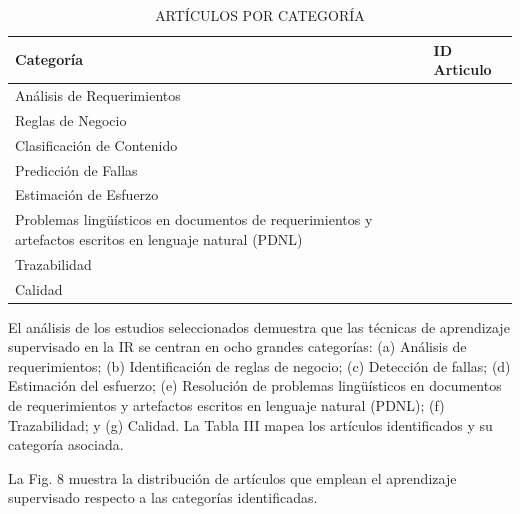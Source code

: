 \documentclass[journal]{IEEEtran}
\begin{document}
\begin{table}[!t]
\renewcommand{\arraystretch}{1.3}
\caption{ARTÍCULOS POR CATEGORÍA}
\label{tabla3}
\centering
\begin{tabular}{p{3cm}p{4.5cm}}
\hline
\hline
Categoría & ID Articulo \\
\hline
Análisis de Requerimientos & \cite{Wang2016} \\ \cline{1-2}
Reglas de Negocio & \cite{sharma2014automated} \\ \cline{1-2}
Clasificación de Contenido & \cite{li2017identifying,Jindal20162027,kurtanovic2017automatically,dekhtyar2017re,abad2017works,Slankas2013,Slankas2013a,Merten2016,winkler2016automatic} \\ \cline{1-2}
Predicción de Fallas & \cite{del2017stability,dargan2016systems,fitzgerald2012early,malhotra2017exploratory,del2011requirement} \\ \cline{1-2}
Estimación de Esfuerzo & \cite{Abdukalykov2011158} \\ \cline{1-2}
Problemas lingüísticos en documentos de requerimientos y
artefactos escritos en lenguaje natural (PDNL) & \cite{yang2010extending,yang2012speculative,Knauss201685,Yang2011,Ott2013,nikora2009automated} \\ \cline{1-2}
Trazabilidad & \cite{Li201725,Cleland-Huang2010,gokyer2008non,Mills2017,Sardinha2013,AtasM.2018} \\ \cline{1-2}
Calidad & \cite{Parra2015180,Hayes2015,Hussain2007} \\
\hline \hline                                                                                                    
\end{tabular}
\end{table}









El análisis de los estudios seleccionados demuestra que las técnicas de aprendizaje supervisado en la IR se centran en ocho grandes categorías: (a) Análisis de requerimientos; (b) Identificación de reglas de negocio; (c) Detección de fallas; (d) Estimación del esfuerzo; (e) Resolución de problemas lingüísticos en documentos de requerimientos y artefactos escritos en lenguaje natural (PDNL); (f) Trazabilidad; y (g) Calidad. La Tabla III mapea los artículos identificados y su categoría asociada. 

La Fig. 8 muestra la distribución de artículos que emplean el aprendizaje supervisado respecto a las categorías identificadas.
\end{document}
